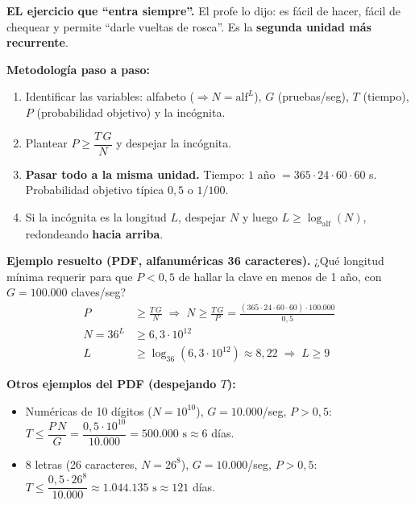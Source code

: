 \documentclass[../main.tex]{subfiles}
\begin{document}
\begin{examen}
\textbf{EL ejercicio que ``entra siempre''.} El profe lo dijo: es fácil de hacer, fácil de chequear y permite ``darle vueltas de rosca''. Es la \textbf{segunda unidad más recurrente}.

\medskip\noindent\textbf{Metodología paso a paso:}
\begin{enumerate}[itemsep=2pt]
  \item Identificar las variables: alfabeto ($\Rightarrow N=\text{alf}^{L}$), $G$ (pruebas/seg), $T$ (tiempo), $P$ (probabilidad objetivo) y la incógnita.
  \item Plantear $P \ge \dfrac{T\,G}{N}$ y despejar la incógnita.
  \item \textbf{Pasar todo a la misma unidad.} Tiempo: $1$ año $=365\cdot24\cdot60\cdot60$ s. Probabilidad objetivo típica $0{,}5$ o $1/100$.
  \item Si la incógnita es la longitud $L$, despejar $N$ y luego $L \ge \log_{\text{alf}}(N)$, redondeando \textbf{hacia arriba}.
\end{enumerate}

\medskip\noindent\textbf{Ejemplo resuelto (PDF, alfanuméricas 36 caracteres).} ¿Qué longitud mínima requerir para que $P<0{,}5$ de hallar la clave en menos de 1 año, con $G=100.000$ claves/seg?
\begin{align}
P &\ge \frac{T\,G}{N} \;\Rightarrow\; N \ge \frac{T\,G}{P} = \frac{(365\cdot24\cdot60\cdot60)\cdot 100.000}{0{,}5}\\
N = 36^{L} &\ge 6{,}3\cdot 10^{12}\\
L &\ge \log_{36}\!\left(6{,}3\cdot 10^{12}\right) \approx 8{,}22 \;\Rightarrow\; L \ge 9
\end{align}

\medskip\noindent\textbf{Otros ejemplos del PDF (despejando $T$):}
\begin{itemize}[itemsep=1pt]
  \item Numéricas de 10 dígitos ($N=10^{10}$), $G=10.000$/seg, $P>0{,}5$: \; $T \le \dfrac{P\,N}{G}=\dfrac{0{,}5\cdot10^{10}}{10.000}=500.000\text{ s}\approx 6$ días.
  \item 8 letras (26 caracteres, $N=26^8$), $G=10.000$/seg, $P>0{,}5$: \; $T \le \dfrac{0{,}5\cdot26^8}{10.000}\approx 1.044.135\text{ s}\approx 121$ días.
\end{itemize}
\end{examen}
\end{document}
